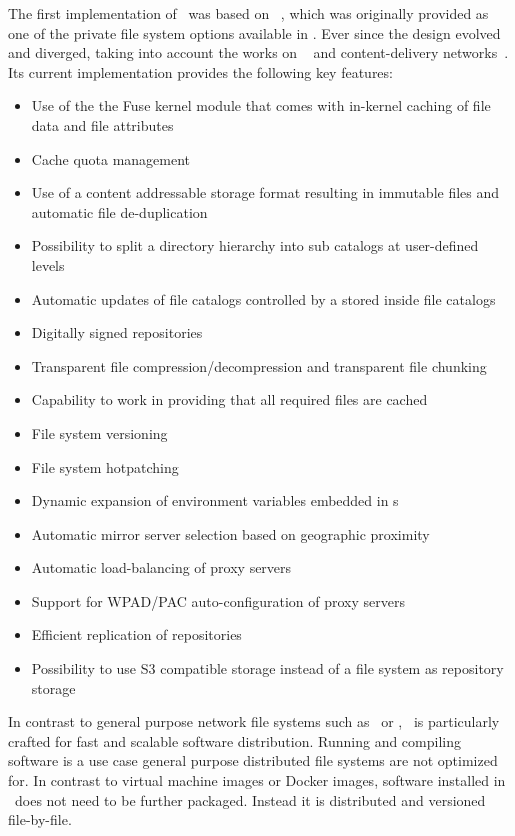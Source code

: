 The first implementation of \cvmfs\ was based on ~\cite{parrot05, growfs09}, which was originally provided as one of the private file system options available in .
Ever since the design evolved and diverged, taking into account the works on ~\cite{httpfuse06} and content-delivery networks~\cite{caspar03,coral03,akamai10}.
Its current implementation provides the following key features:
\begin{itemize}
	\item Use of the the Fuse kernel module that comes with in-kernel caching of file data and file attributes
	\item Cache quota management
	\item Use of a content addressable storage format resulting in immutable files and automatic file de-duplication
	\item Possibility to split a directory hierarchy into sub catalogs at user-defined levels
	\item Automatic updates of file catalogs controlled by a  stored inside file catalogs
	\item Digitally signed repositories
	\item Transparent file compression/decompression and transparent file chunking
	\item Capability to work in  providing that all required files are cached
	\item File system versioning
	\item File system hotpatching
	\item Dynamic expansion of environment variables embedded in s
	\item Automatic mirror server selection based on geographic proximity
	\item Automatic load-balancing of proxy servers
	\item Support for WPAD/PAC auto-configuration of proxy servers
	\item Efficient replication of repositories
	\item Possibility to use S3 compatible storage instead of a file system as repository storage
\end{itemize}

In contrast to general purpose network file systems such as \nfs\ or \afs, \cvmfs\ is particularly crafted for fast and scalable software distribution.
Running and compiling software is a use case general purpose distributed file systems are not optimized for.
In contrast to virtual machine images or Docker images, software installed in \cvmfs\ does not need to be further packaged.
Instead it is distributed and versioned file-by-file.


